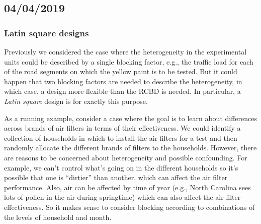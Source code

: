 \documentclass[a4paper, 12pt]{article}
\theoremstyle{plain}
\theoremstyle{definition}
\theoremstyle{remark}
\begin{document}
\subsection*{04/04/2019}

\subsubsection*{Latin square designs}

Previously we considered the case where the heterogeneity in the experimental units could be described by a single blocking factor, e.g., the traffic load for each of the road segments on which the yellow paint is to be tested.  But it could happen that two blocking factors are needed to describe the heterogeneity, in which case, a design more flexible than the RCBD is needed.  In particular, a {\em Latin square} design is for exactly this purpose.  

As a running example, consider a case where the goal is to learn about differences across brands of air filters in terms of their effectiveness.  We could identify a collection of households in which to install the air filters for a test and then randomly allocate the different brands of filters to the households.  However, there are reasons to be concerned about heterogeneity and possible confounding.  For example, we can't control what's going on in the different households so it's possible that one is ``dirtier'' than another, which can affect the air filter performance.  Also, air can be affected by time of year (e.g., North Carolina sees lots of pollen in the air during springtime) which can also affect the air filter effectiveness.  So it makes sense to consider blocking according to combinations of the levels of household and month.  
\end{document}
